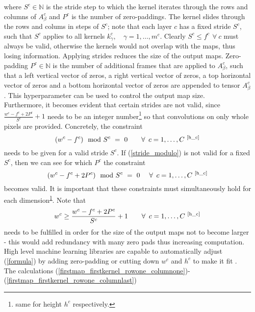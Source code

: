 \documentclass{article}
\begin{document}
where $S^c \in \mathbb{N}$ is the stride step to which the kernel iterates through the rows and columns of $A_\beta^c$ and $P^c$ is the number of zero-paddings. The kernel slides through the rows and colums in steps of $S^c$; note that each layer $c$ has a fixed stride $S^c$, such that $S^c$ applies to all kernels $k_\gamma^c, \quad \gamma=1,\ldots,m^c$. Clearly $S^c \leq f^c \ \, \forall \  c$ must always be valid, otherwise the kernels would not overlap with the maps, thus losing information. Applying strides reduces the size of the output maps.
Zero-padding $P^c \in \mathbb{N}$ is the number of additional frames that are applied to $A_\beta^c$, such that a left vertical vector of zeros, a right vertical vector of zeros, a top horizontal vector of zeros and a bottom horizontal vector of zeros are appended to tensor $A_\beta^c$. This hyperparameter can be used to control the output map size.\\
Furthermore, it becomes evident that certain strides are not valid, since $\frac{w^c - f^c + 2P^c}{S^c}+1$ needs to be an integer number\footnote{same for height $h^c$ respectively.\label{h_c}} so that convolutions on only whole pixels are provided. Concretely, the constraint
\begin{equation}
(w^c - f^c) \mod S^c \ = \ 0 \quad \quad \forall \ \, c=1,\ldots, C \ \textsuperscript{\ref{h_c}} \label{stride_modulo}
\end{equation}
needs to be given for a valid stride $S^c$.
If (\ref{stride_modulo}) is not valid for a fixed $S^c$, then we can see for which $P^c$ the constraint
\begin{equation} \label{formula}
(w^c - f^c + 2P^c) \mod S^c \ = \ 0 \ \quad \forall \ \, c=1,\ldots, C \ \textsuperscript{\ref{h_c}}
\end{equation}
becomes valid. It is important that these constraints must simultaneously hold for each dimension\textsuperscript{\ref{h_c}}. Note that 
\begin{equation}
w^c \geq \frac{w^c - f^c + 2P^c}{S^c} + 1 \quad \quad \forall \ \, c=1,\ldots, C \ \textsuperscript{\ref{h_c}}
\end{equation}
needs to be fulfilled in order for the size of the output maps not to become larger - this would add redundancy with many zero pads thus increasing computation. High level machine learning libraries are capable to automatically adjust (\ref{formula}) by adding zero-padding or cutting down $w^c$ and $h^c$ to make it fit \cite{cs231:optimizers}.\\
The calculations (\ref{firstmap_firstkernel_rowone_columnone})-(\ref{firstmap_firstkernel_rowone_columnlast})
\end{document}
